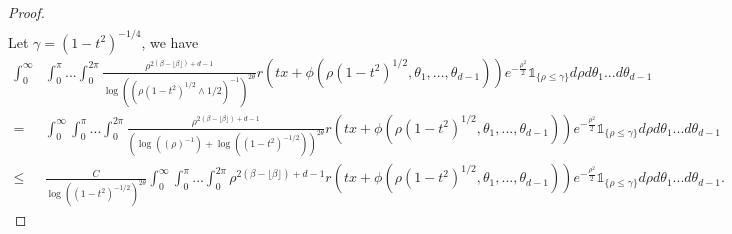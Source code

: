\documentclass{article}
\begin{document}
\begin{proof}
\begin{align*}
\end{align*}
Let $\gamma=(1-t^2)^{-1/4}$, we have
\begin{align*}
\int_0^{\infty}&\int_0^\pi... \int_0^{2\pi} \frac{\rho^{2(\beta-\lfloor \beta \rfloor) +d-1 }}{\log((\rho(1-t^2)^{1/2}\wedge 1/2)^{-1})^{2\theta}}r(tx +\phi(\rho(1-t^2)^{1/2},\theta_1,...,\theta_{d-1}))e^{-\frac{\rho^2}{2}}\mathds{1}_{\{\rho\leq \gamma\}}d\rho d\theta_1...d\theta_{d-1}\nonumber\\
= & \int_0^{\infty}\int_0^\pi... \int_0^{2\pi} \frac{\rho^{2(\beta-\lfloor \beta \rfloor) +d-1 }}{(\log((\rho)^{-1})+\log((1-t^2)^{-1/2}))^{2\theta}}r(tx +\phi(\rho(1-t^2)^{1/2},\theta_1,...,\theta_{d-1}))e^{-\frac{\rho^2}{2}}\mathds{1}_{\{\rho\leq \gamma\}}d\rho d\theta_1...d\theta_{d-1}\\
\leq & \frac{C}{\log((1-t^2)^{-1/2})^{2\theta}} \int_0^{\infty}\int_0^\pi... \int_0^{2\pi} \rho^{2(\beta-\lfloor \beta \rfloor) +d-1 }r(tx +\phi(\rho(1-t^2)^{1/2},\theta_1,...,\theta_{d-1}))e^{-\frac{\rho^2}{2}}\mathds{1}_{\{\rho\leq \gamma\}}d\rho d\theta_1...d\theta_{d-1}.
\end{align*}


\end{proof}
\end{document}
